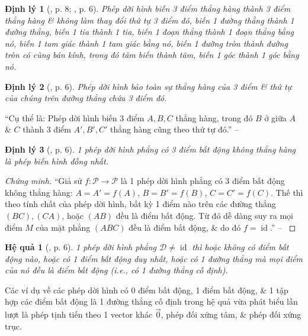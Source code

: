 \documentclass[oneside]{book}
\numberwithin{equation}{section}
\newtheorem{hequa}{Hệ quả}[section]
\newtheorem{dinhly}{Định lý}[section]
\begin{document}
\begin{dinhly}[\cite{SGK_Toan_11_hinh_hoc_nang_cao}, p. 8; \cite{TL_chuyen_Toan_Hinh_Hoc_11}, p. 6]
	Phép dời hình biến 3 điểm thẳng hàng thành 3 điểm thẳng hàng \& không làm thay đổi thứ tự 3 điểm đó, biến 1 đường thằng thành 1 đường thẳng, biến 1 tia thành 1 tia, biến 1 đoạn thẳng thành 1 đoạn thẳng bằng nó, biến 1 tam giác thành 1 tam giác bằng nó, biến 1 đường tròn thành đường tròn có cùng bán kính, trong đó tâm biến thành tâm, biến 1 góc thành 1 góc bằng nó.
\end{dinhly}

\begin{dinhly}[\cite{TL_chuyen_Toan_Hinh_Hoc_11}, p. 6]
	Phép dời hình bảo toàn sự thẳng hàng của 3 điểm \& thứ tự của chúng trên đường thẳng chứa 3 điểm đó.
\end{dinhly}
``Cụ thể là: Phép dời hình biến 3 điểm $A,B,C$ thẳng hàng, trong đó $B$ ở giữa $A$ \& $C$ thành 3 điểm $A',B',C'$ thẳng hàng cũng theo thứ tự đó.'' -- \cite[p. 6]{TL_chuyen_Toan_Hinh_Hoc_11}

\begin{dinhly}[\cite{TL_chuyen_Toan_Hinh_Hoc_11}, p. 6]
	1 phép dời hình phẳng có 3 điểm bất động không thẳng hàng là phép biến hình đồng nhất.
\end{dinhly}

\begin{proof}[Chứng minh]
	``Giả sử $f:\mathcal{P}\to\mathcal{P}$ là 1 phép dời hình phẳng có 3 điểm bất động không thẳng hàng: $A = A' = f(A)$, $B = B' = f(B)$, $C = C' = f(C)$. Thế thì theo tính chất của phép dời hình, bất kỳ 1 điểm nào trên các đường thẳng $(BC),(CA)$, hoặc $(AB)$ đều là điểm bất động. Từ đó dễ dàng suy ra mọi điểm $M$ của mặt phẳng $(ABC)$ đều là điểm bất động, \& do đó $f = \operatorname{id}$.'' -- \cite[p. 6]{TL_chuyen_Toan_Hinh_Hoc_11}
\end{proof}

\begin{hequa}[\cite{TL_chuyen_Toan_Hinh_Hoc_11}, p. 6]
	1 phép dời hình phẳng $\mathcal{D}\ne\operatorname{id}$ thì hoặc không có điểm bất động nào, hoặc có 1 điểm bất động duy nhất, hoặc có 1 đường thẳng mà mọi điểm của nó đều là điểm bất động (i.e., có 1 đường thẳng cố định).
\end{hequa}
Các ví dụ về các phép dời hình có 0 điểm bất động, 1 điểm bất động, \& 1 tập hợp các điểm bất động là 1 đường thẳng cố định trong hệ quả vừa phát biểu lần lượt là phép tịnh tiến theo 1 vector khác $\vec{0}$, phép đối xứng tâm, \& phép đối xứng trục.
\end{document}
